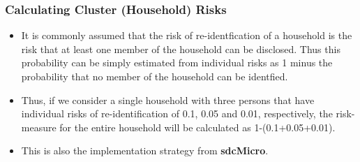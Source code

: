 \documentclass{beamer}
\begin{document}
	\begin{frame}
		\frametitle{Calculating Cluster (Household) Risks}
		\begin{itemize}			
			\item It is commonly assumed that the risk of re-identﬁcation of a household is the risk
			that at least one member of the household can be disclosed. Thus this probability
			can be simply estimated from individual risks as 1 minus the probability that no
			member of the household can be identﬁed. 
			\item Thus, if we consider a single household
			with three persons that have individual risks of re-identiﬁcation of 0.1, 0.05 and
			0.01, respectively, the risk-measure for the entire household will be calculated as
			1-(0.1+0.05+0.01). 
			\item This is also the implementation strategy from \textbf{sdcMicro}.
		\end{itemize}
	\end{frame}
	
\end{document}
